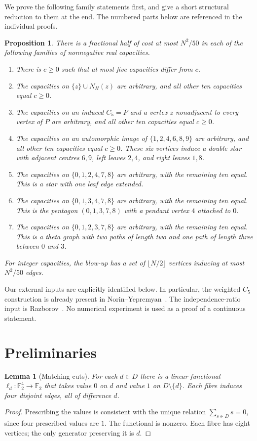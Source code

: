 \documentclass[11pt]{article}
\newtheorem{lemma}[theorem]{Lemma}
\newtheorem{proposition}[theorem]{Proposition}
\newcommand{\F}{\mathbb F}
\begin{document}
We prove the following family statements first, and give a short
structural reduction to them at the end. The numbered parts below
are referenced in the individual proofs.

\begin{proposition}\label{prop:families}
There is a fractional half of cost at most $N^2/50$ in each of the following
families of nonnegative real capacities.
\begin{enumerate}
\item There is $c\geq0$ such that at most five capacities differ from $c$.
\item The capacities on $\{z\}\cup N_H(z)$ are arbitrary, and all other
ten capacities equal $c\geq0$.
\item The capacities on an induced $C_5=P$ and a vertex $z$ nonadjacent
to every vertex of $P$ are arbitrary, and all other ten capacities equal
$c\geq0$.
\item The capacities on an automorphic image of
$\{1,2,4,6,8,9\}$ are arbitrary, and all other ten capacities equal
$c\geq0$. These six vertices induce a double star with adjacent centres
$6,9$, left leaves $2,4$, and right leaves $1,8$.
\item The capacities on $\{0,1,2,4,7,8\}$ are arbitrary, with the
remaining ten equal. This is a star with one leaf edge extended.
\item The capacities on $\{0,1,3,4,7,8\}$ are arbitrary, with the
remaining ten equal. This is the pentagon $(0,1,3,7,8)$ with a
pendant vertex $4$ attached to $0$.
\item The capacities on $\{0,1,2,3,7,8\}$ are arbitrary, with the
remaining ten equal. This is a theta graph with two paths of length two
and one path of length three between $0$ and $3$.
\end{enumerate}
For integer capacities, the blow-up has a set of $\lfloor N/2\rfloor$
vertices inducing at most $N^2/50$ edges.
\end{proposition}

Our external inputs are explicitly identified below. In particular,
the weighted $C_5$ construction is already present in
Norin--Yepremyan~\cite[proof of Theorem 3.1, $d=2$]{NY}.
The independence-ratio input is Razborov~\cite[Corollary 3.7]{R}.
No numerical experiment is used as a proof of a continuous statement.

\section{Preliminaries}
\begin{lemma}[Matching cuts]\label{lem:cuts}
For each $d\in D$ there is a linear functional $\ell_d:\F_2^4\to\F_2$
that takes value $0$ on $d$ and value $1$ on $D\setminus\{d\}$.
Each fibre induces four disjoint edges, all of difference $d$.
\end{lemma}
\begin{proof}
Prescribing the values is consistent with the unique relation
$\sum_{s\in D}s=0$, since four prescribed values are $1$.
The functional is nonzero. Each fibre has eight vertices; the only
generator preserving it is $d$.
\end{proof}
\end{document}
